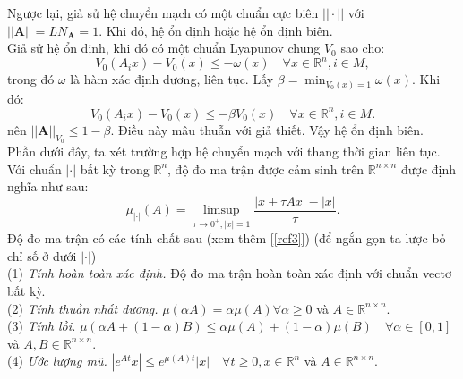 \documentclass[14pt,a4paper,oneside]{report}		%
\theoremstyle{definition}
\begin{document}
Ngược lại, giả sử hệ chuyển mạch có một chuẩn cực biên $||\cdot||$ với $||\mathbf{A}||=LN_\mathbf{A}=1$. Khi đó, hệ ổn định hoặc hệ ổn định biên.\\
Giả sử hệ ổn định, khi đó có một chuẩn Lyapunov chung $V_0$ sao cho:
$$V_0(A_ix)-V_0(x)\leq -\omega (x)\quad\forall x\in\mathbb{R}^n,i\in M,$$
trong đó $\omega$ là hàm xác định dương, liên tục. Lấy $\beta =\min_{V_0(x)=1}\omega(x)$. Khi đó:
$$V_0(A_ix)-V_0(x)\leq -\beta V_0(x)\quad\forall x\in\mathbb{R}^n,i\in M.$$
nên $||\mathbf{A}||_{V_0}\leq 1-\beta$. Điều này mâu thuẫn với giả thiết. Vậy hệ ổn định biên.\\

Phần dưới đây, ta xét trường hợp hệ chuyển mạch với thang thời gian liên tục. Với chuẩn $|\cdot|$ bất kỳ trong $\mathbb{R}^n$, độ đo ma trận được cảm sinh trên $\mathbb{R}^{n\times n}$ được định nghĩa như sau:
\begin{equation} \label{eq2-39}
\mu_{|\cdot|}(A)=\limsup_{\tau \rightarrow 0^+,|x|=1}\frac{|x+\tau Ax|-|x|}{\tau}.
\end{equation}
Độ đo ma trận có các tính chất sau (xem thêm [\ref{ref3}]) (để ngắn gọn ta lược bỏ chỉ số ở dưới $|\cdot|$)\\
(1) \textit{Tính hoàn toàn xác định.} Độ đo ma trận hoàn toàn xác định với chuẩn vectơ bất kỳ.\\
(2) \textit{Tính thuần nhất dương.} $\mu (\alpha A)=\alpha\mu (A)\forall\alpha\geq 0$ và $A\in\mathbb{R}^{n\times n}$.\\
(3) \textit{Tính lồi.} $\mu (\alpha A+(1-\alpha)B)\leq \alpha\mu(A)+(1-\alpha)\mu(B)\quad\forall\alpha\in [0,1]$ và $A,B\in\mathbb{R}^{n\times n}$.\\
(4) \textit{Ước lượng mũ.} $|e^{At}x|\leq e^{\mu (A)t}|x|\quad\forall t\geq 0,x\in\mathbb{R}^n$ và $A\in\mathbb{R}^{n\times n}$.\\
\end{document}
